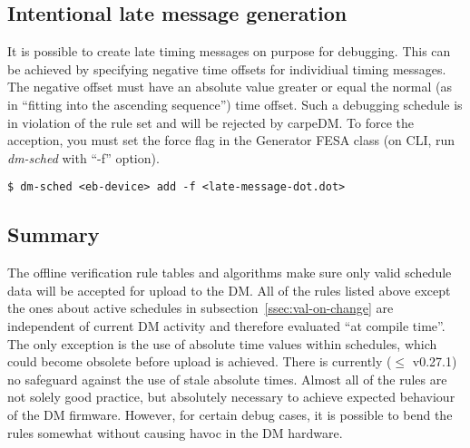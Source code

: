 \subsection{Intentional late message generation}
%
It is possible to create late timing messages on purpose for debugging. This can be achieved by specifying negative time offsets for individiual timing messages. The negative offset must have an absolute value greater or equal the normal (as in \enquote{fitting into the ascending sequence}) time offset. Such a debugging schedule is in violation of the rule set and will be rejected by carpeDM. To force the acception, you must set the force flag in the Generator FESA class (on CLI, run \emph{dm-sched} with \enquote{-f} option). 
\begin{lstlisting}[style = customshell]
$ dm-sched <eb-device> add -f <late-message-dot.dot>
\end{lstlisting}


\subsection{Summary}
The offline verification rule tables and algorithms make sure only valid schedule data will be accepted for upload to the DM. 
All of the rules listed above except the ones about active schedules in subsection~\ref{ssec:val-on-change} are independent of current DM activity and therefore evaluated \enquote{at compile time}.
The only exception is the use of absolute time values within schedules, which could become obsolete before upload is achieved. There is currently ($\le$ v0.27.1) no safeguard against the use of stale absolute times.
Almost all of the rules are not solely good practice, but absolutely necessary to achieve expected behaviour of the DM firmware. However, for certain debug cases, it is possible to bend the rules somewhat without causing havoc in the DM hardware.


